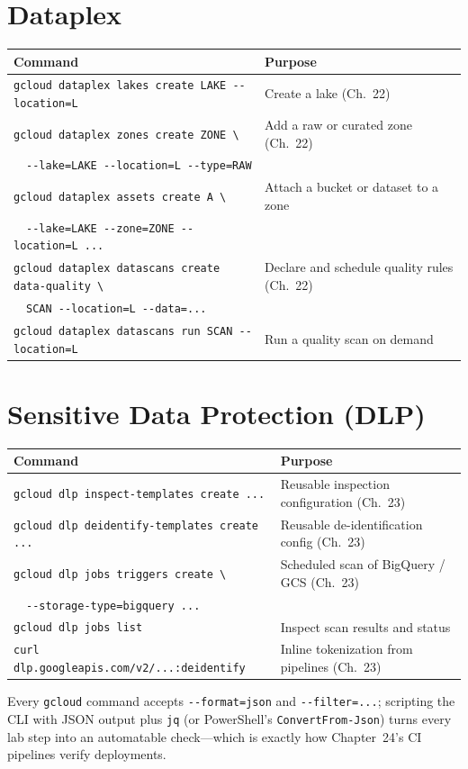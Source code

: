 \section{Dataplex}
\begin{center}
\footnotesize
\begin{tabular}{@{}p{6.6cm}p{6.2cm}@{}}
\toprule
\textbf{Command} & \textbf{Purpose} \\
\midrule
\texttt{gcloud dataplex lakes create LAKE -{}-location=L} & Create a lake (Ch.~22) \\
\texttt{gcloud dataplex zones create ZONE \textbackslash} & Add a raw or curated zone (Ch.~22) \\
~~\texttt{-{}-lake=LAKE -{}-location=L -{}-type=RAW} & \\
\texttt{gcloud dataplex assets create A \textbackslash} & Attach a bucket or dataset to a zone \\
~~\texttt{-{}-lake=LAKE -{}-zone=ZONE -{}-location=L ...} & \\
\texttt{gcloud dataplex datascans create data-quality \textbackslash} & Declare and schedule quality rules (Ch.~22) \\
~~\texttt{SCAN -{}-location=L -{}-data=...} & \\
\texttt{gcloud dataplex datascans run SCAN -{}-location=L} & Run a quality scan on demand \\
\bottomrule
\end{tabular}
\end{center}

\section{Sensitive Data Protection (DLP)}
\begin{center}
\footnotesize
\begin{tabular}{@{}p{6.6cm}p{6.2cm}@{}}
\toprule
\textbf{Command} & \textbf{Purpose} \\
\midrule
\texttt{gcloud dlp inspect-templates create ...} & Reusable inspection configuration (Ch.~23) \\
\texttt{gcloud dlp deidentify-templates create ...} & Reusable de-identification config (Ch.~23) \\
\texttt{gcloud dlp jobs triggers create \textbackslash} & Scheduled scan of BigQuery / GCS (Ch.~23) \\
~~\texttt{-{}-storage-type=bigquery ...} & \\
\texttt{gcloud dlp jobs list} & Inspect scan results and status \\
\texttt{curl dlp.googleapis.com/v2/...:deidentify} & Inline tokenization from pipelines (Ch.~23) \\
\bottomrule
\end{tabular}
\end{center}

\begin{tipbox}
Every \texttt{gcloud} command accepts \texttt{-{}-format=json} and \texttt{-{}-filter=...};
scripting the CLI with JSON output plus \texttt{jq} (or PowerShell's \texttt{ConvertFrom-Json})
turns every lab step into an automatable check---which is exactly how Chapter~24's CI pipelines
verify deployments.
\end{tipbox}
